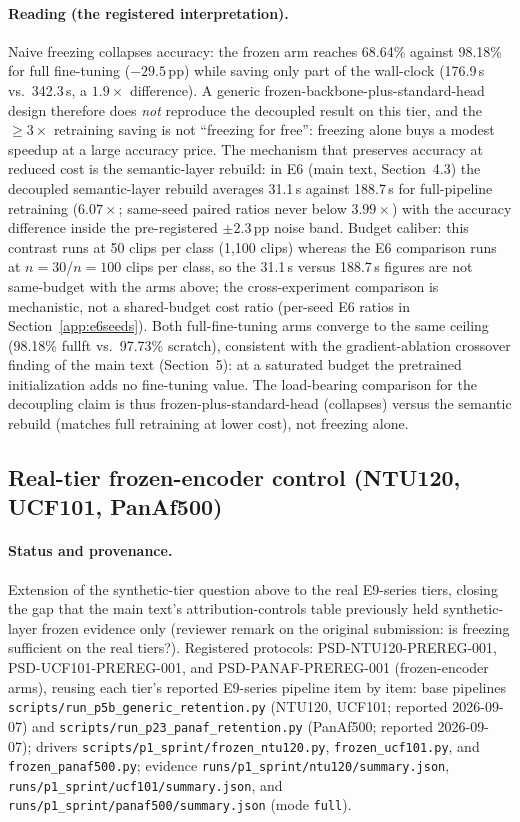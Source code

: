 \documentclass[11pt,a4paper]{article}
\begin{document}
\paragraph{Reading (the registered interpretation).}
Naive freezing collapses accuracy: the frozen arm reaches 68.64\% against 98.18\% for full fine-tuning ($-29.5$\,pp) while saving only part of the wall-clock (176.9\,s vs.\ 342.3\,s, a $1.9\times$ difference). A generic frozen-backbone-plus-standard-head design therefore does \emph{not} reproduce the decoupled result on this tier, and the $\geq 3\times$ retraining saving is not ``freezing for free'': freezing alone buys a modest speedup at a large accuracy price. The mechanism that preserves accuracy at reduced cost is the semantic-layer rebuild: in E6 (main text, Section~4.3) the decoupled semantic-layer rebuild averages 31.1\,s against 188.7\,s for full-pipeline retraining ($6.07\times$; same-seed paired ratios never below $3.99\times$) with the accuracy difference inside the pre-registered $\pm 2.3$\,pp noise band. Budget caliber: this contrast runs at 50 clips per class (1{,}100 clips) whereas the E6 comparison runs at $n{=}30$/$n{=}100$ clips per class, so the 31.1\,s versus 188.7\,s figures are not same-budget with the arms above; the cross-experiment comparison is mechanistic, not a shared-budget cost ratio (per-seed E6 ratios in Section~\ref{app:e6seeds}). Both full-fine-tuning arms converge to the same ceiling (98.18\% fullft vs.\ 97.73\% scratch), consistent with the gradient-ablation crossover finding of the main text (Section~5): at a saturated budget the pretrained initialization adds no fine-tuning value. The load-bearing comparison for the decoupling claim is thus frozen-plus-standard-head (collapses) versus the semantic rebuild (matches full retraining at lower cost), not freezing alone.

\subsection{Real-tier frozen-encoder control (NTU120, UCF101, PanAf500)}\label{app:frozenreal}

\paragraph{Status and provenance.}
Extension of the synthetic-tier question above to the real E9-series tiers, closing the gap that the main text's attribution-controls table previously held synthetic-layer frozen evidence only (reviewer remark on the original submission: is freezing sufficient on the real tiers?). Registered protocols: PSD-NTU120-PREREG-001, PSD-UCF101-PREREG-001, and PSD-PANAF-PREREG-001 (frozen-encoder arms), reusing each tier's reported E9-series pipeline item by item: base pipelines \texttt{scripts/run\_p5b\_generic\_retention.py} (NTU120, UCF101; reported 2026-09-07) and \texttt{scripts/run\_p23\_panaf\_retention.py} (PanAf500; reported 2026-09-07); drivers \texttt{scripts/p1\_sprint/frozen\_ntu120.py}, \texttt{frozen\_ucf101.py}, and \texttt{frozen\_panaf500.py}; evidence \texttt{runs/p1\_sprint/ntu120/summary.json}, \texttt{runs/p1\_sprint/ucf101/summary.json}, and \texttt{runs/p1\_sprint/panaf500/summary.json} (mode \texttt{full}).
\end{document}
